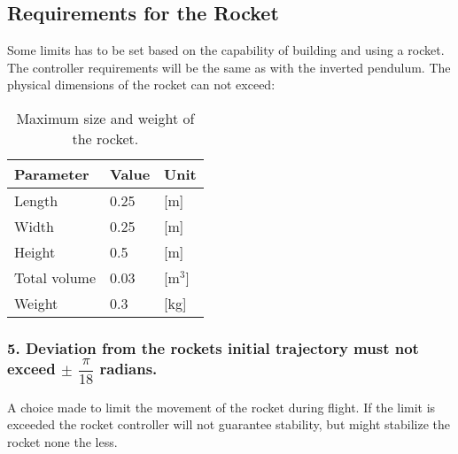\subsection{Requirements for the Rocket}
Some limits has to be set based on the capability of building and using a rocket. The controller requirements will be the same as with the inverted pendulum.  
The physical dimensions of the rocket can not exceed:
\begin{table}[htbp]
\centering\begin{flushleft}
	\begin{flushleft}
		\begin{flushleft}
			\begin{flushleft}
				\begin{flushleft}
					\begin{flushleft}
						\begin{flushleft}
							\begin{flushleft}
								
							\end{flushleft}
						\end{flushleft}
					\end{flushleft}
				\end{flushleft}
			\end{flushleft}
		\end{flushleft}
	\end{flushleft}
\end{flushleft}
\begin{tabular}{lll}
\hline
Parameter    & Value & Unit  \\ \hline
Length       & 0.25  & [m]     \\
Width        & 0.25  & [m]     \\
Height       & 0.5   & [m]     \\
Total volume & 0.03  & [m$^3$] \\
Weight       & 0.3   & [kg]   
\end{tabular}
\caption{Maximum size and weight of the rocket.}
\label{RocketDimensions}
\end{table}


\subsubsection*{5. Deviation from the rockets initial trajectory must not exceed $\pm$ $\dfrac{\pi}{18}$ radians.} 

\forceindent A choice made to limit the movement of the rocket during flight. If the limit is exceeded the rocket controller will not guarantee stability, but might stabilize the rocket none the less. 

